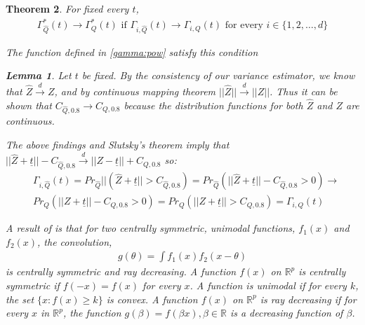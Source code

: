 \documentclass{article}
\newtheorem{theorem}{Theorem}
\newtheorem{lemma}[theorem]{Lemma}
\newcommand{\rvv}{Z}
\newcommand{\distv}{Q}
\begin{document}
\begin{theorem}
For fixed every $t$,  
\begin{align*}
\Gamma^*_{\hat{\distv}}(t) \rightarrow \Gamma^*_{\distv}(t)	\text{ if } \Gamma_{i, \hat{\distv}}(t) \rightarrow \Gamma_{i, \distv}(t) \text{ for every } i \in \{1, 2, \dots, d\}
\end{align*}

The function defined in \eqref{gamma:pow} satisfy this condition

\begin{lemma}
	Let $t$ be fixed.  By the consistency of our variance estimator, we know that $\hat{Z} \xrightarrow{d} Z$, and by continuous mapping theorem $||\hat{Z}|| \xrightarrow{d} ||Z||$.  Thus it can be shown that $C_{\hat{\distv}, 0.8} \rightarrow C_{\distv, 0.8}$ because the distribution functions for both $\hat{\rvv}$ and $\rvv$ are continuous.  

	The above findings and Slutsky's theorem imply that $||\hat{Z} + \underline{t}|| - C_{\hat{\distv}, 0.8} \xrightarrow{d} ||Z - \underline{t}|| + C_{\distv, 0.8}$ so: 
\begin{align*}
	&\Gamma_{i, \hat{Q}}(t) = Pr_{\hat{\distv}}||\left(\hat{Z} + \underline{t}|| > C_{\hat{\distv}, 0.8}\right) = Pr_{\hat{\distv}}\left(||\hat{Z} + \underline{t}|| - C_{\hat{\distv}, 0.8} > 0\right) \rightarrow\\ 
	& Pr_{\distv}\left(||Z + \underline{t}|| - C_{\distv, 0.8} > 0\right) = Pr_{\distv}\left(||Z + \underline{t}|| > C_{\distv, 0.8}\right) =\Gamma_{i, Q}(t) 
\end{align*}
\end{lemma}

A result of \citep{anderson_integral_1955} is that for two centrally symmetric, unimodal functions, $f_1(x)$ and  $f_2(x)$, the convolution,  
\begin{align*}
	g(\theta) = \int f_1(x) f_2(x - \theta)
\end{align*}
is centrally symmetric and ray decreasing.  A function $f(x)$ on $\mathbb{R}^p$ is centrally symmetric if $f(-x) = f(x)$ for every $x$.  A function is unimodal if for every $k$, the set $\{x : f(x) \geq k\}$ is convex. A function $f(x)$ on $\mathbb{R}^p$ is ray decreasing if for every $x$ in $\mathbb{R}^p$, the function $g(\beta) = f(\beta x), \beta \in \mathbb{R}$ is a decreasing function of $\beta$.


\end{theorem}
\end{document}
